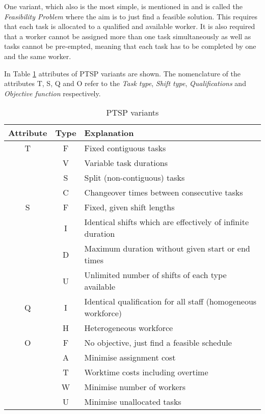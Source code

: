 One variant, which also is the most simple, is mentioned in \citet{krishnamoorthy_2001} and is called the \textit{Feasibility Problem} where the aim is to just find a feasible solution. This requires that each task is allocated to a qualified and available worker. It is also required that a worker cannot be assigned more than one task simultaneously as well as tasks cannot be pre-empted, meaning that each task has to be completed by one and the same worker.

In Table \ref{tab:PTSP} attributes of PTSP variants are shown. The nomenclature of the attributes T, S, Q and O refer to the \textit{Task type}, \textit{Shift type}, \textit{Qualifications} and \textit{Objective function} respectively. 
\begin{table}[H]
\caption{PTSP variants}
\label{tab:PTSP}
\begin{tabular}{|c|c|l|}
\hline
\textbf{Attribute} & \textbf{Type} & \textbf{Explanation} \\ \hline
T & F & Fixed contiguous tasks \\
& V & Variable task durations \\
& S & Split (non-contiguous) tasks \\
& C & Changeover times between consecutive tasks \\
\hline 
S & F & Fixed, given shift lengths \\
& I & Identical shifts which are effectively of infinite duration \\
& D & Maximum duration without given start or end times \\
& U & Unlimited number of shifts of each type available \\
\hline 
Q & I & Identical qualification for all staff (homogeneous workforce) \\
& H & Heterogeneous workforce \\
\hline 
O & F & No objective, just find a feasible schedule \\
& A & Minimise assignment cost \\
& T & Worktime costs including overtime \\
& W & Minimise number of workers \\
& U & Minimise unallocated tasks \\
\hline  

\end{tabular}
\end{table}

